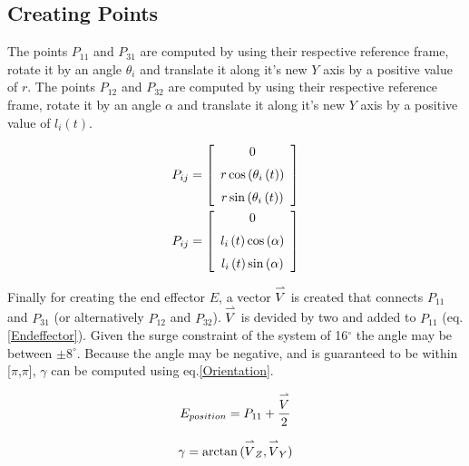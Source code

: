 \subsection{Creating Points}

 The points $P_{11}$ and $P_{31}$ are computed by using their respective reference frame, rotate it by an angle $\theta_i$ and translate it along it's new $Y$ axis by a positive value of $r$.\newline
 The points $P_{12}$ and $P_{32}$ are computed by using their respective reference frame, rotate it by an angle $\alpha$ and translate it along it's new $Y$ axis by a positive value of $l_i\left( t \right)$.

\begin{align*}
P_{ij} =  \left[ \begin {array}{c} 0\\ \noalign{\medskip}r\cos \left( \theta_{i
} \left( t \right)  \right) \\ \noalign{\medskip}r\sin \left( \theta_{
i} \left( t \right)  \right) \end {array} \right] \\
P_{ij} =  \left[ \begin {array}{c} 0\\ \noalign{\medskip}l_{i} \left( t
 \right) \cos \left( \alpha \right) \\ \noalign{\medskip}l_{i} \left( 
t \right) \sin \left( \alpha \right) \end {array} \right] 
\end{align*}

 Finally for creating the end effector $E$, a vector $\overset{\large\rightharpoonup}{\small{V}}$ is created that connects  $P_{11}$ and $P_{31}$ (or alternatively $P_{12}$ and $P_{32}$). $\overset{\large\rightharpoonup}{\small{V}}$ is devided by two and added to $P_{11}$ (eq. \ref{Endeffector}).
 Given the surge constraint of the system of 16$^{\circ}$ the angle may be between $\pm8^{\circ}$. Because the angle may be negative, and is guaranteed to be within [$\pi$,$\pi$], $\gamma$ can be computed using eq.\ref{Orientation}.
 
 \begin{equation}
    E_{position} = P_{11} + \frac{ \overset{\large\rightharpoonup}{\small{V}} }{2}
    \label{Endeffector}
 \end{equation}
 
  \begin{equation}
    \gamma = \arctan{ (\overset{\large\rightharpoonup}{\small{V}}_Z,\overset{\large\rightharpoonup}{\small{V}}_Y ) }
    \label{Orientation}
 \end{equation}

